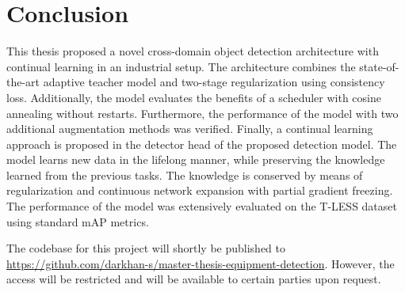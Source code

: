 \documentclass[english, 12pt, a4paper, elec, utf8, a-1b, online]{aaltothesis}
\begin{document}
\clearpage


\section{Conclusion} 

This thesis proposed a novel cross-domain object detection architecture with continual learning in an industrial setup. The architecture combines the state-of-the-art adaptive teacher model and two-stage regularization using consistency loss. Additionally, the model evaluates the benefits of a scheduler with cosine annealing without restarts. Furthermore, the performance of the model with two additional augmentation methods was verified. Finally, a continual learning approach is proposed in the detector head of the proposed detection model. The model learns new data in the lifelong manner, while preserving the knowledge learned from the previous tasks. The knowledge is conserved by means of regularization and continuous network expansion with partial gradient freezing. The performance of the model was extensively evaluated on the T-LESS dataset using standard mAP metrics. 

The codebase for this project will shortly be published to \url{https://github.com/darkhan-s/master-thesis-equipment-detection}. However, the access will be restricted and will be available to certain parties upon request.  
\end{document}
